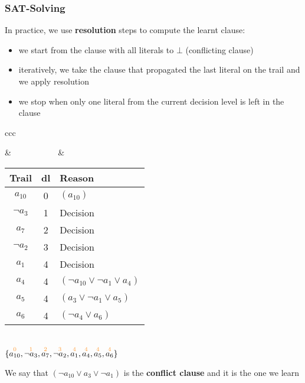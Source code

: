 \begin{frame}
  \frametitle{SAT-Solving}

  \scriptsize

  In practice, we use {\bf resolution} steps to compute the learnt clause:
  \begin{itemize}
    \item we start from the clause with all literals to $\bot$ (conflicting clause)
    \item iteratively, we take the clause that propagated the last literal on the trail
	  and we apply resolution
    \item we stop when only one literal from the current decision level is left in the clause 
  \end{itemize}
  \vfill
  \begin{tabular}{ccc}
    \begin{minipage}{.4\textwidth}
      \scalebox{.4}{}
    \end{minipage}
    & ~~~~~~~~~~ &
    \begin{minipage}{.4\textwidth}
      \begin{tabular}{ccl}
	\hline
	Trail & dl & Reason \\
	\hline
	$a_{10}$   & 0 & $( a_{10} )$ \\
	$\neg a_3$ & 1 & Decision \\
	$a_7$      & 2 & Decision \\
	$\neg a_2$ & 3 & Decision \\
	$a_1$      & 4 & Decision \\
	$a_4$      & 4 & $(\neg a_{10} \vee \neg a_1 \vee a_4)$ \\
	$a_5$      & 4 & $(a_3 \vee \neg a_1 \vee a_5)$ \\
	$a_6$      & 4 & $(\neg a_4 \vee a_6)$ \\
	\hline
      \end{tabular}
      \medskip \\
      $\{ \dec{a_{10}}{0}, \dec{\neg a_3}{1}, \dec{a_7}{2}, \dec{\neg a_2}{3}, \dec{a_1}{4}, \dec{a_4}{4}, \dec{a_5}{4}, \dec{a_6}{4}\}$
    \end{minipage}
  \end{tabular}
  \vfill
  We say that $(\neg a_{10} \vee a_3 \vee \neg a_1)$ is the {\bf conflict clause} and it is the one we learn

\end{frame}

